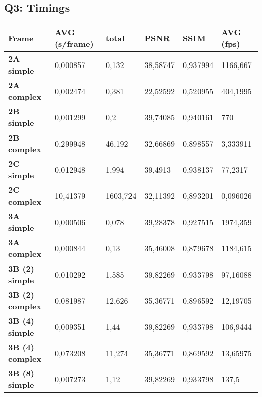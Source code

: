 \begin{appendices}
\section{Q3: Timings}\label{Q3:timings}
\begin{table}[h]
\begin{tabular}{|l|l|l|l|l|l|}
\hline
\textbf{Frame}           & \textbf{AVG (s/frame)} & \textbf{total} & \textbf{PSNR} & \textbf{SSIM} & \textbf{AVG (fps)} \\ \hline
\textbf{2A simple}       & 0,000857               & 0,132          & 38,58747      & 0,937994      & 1166,667           \\ \hline
\textbf{2A complex}      & 0,002474               & 0,381          & 22,52592      & 0,520955      & 404,1995           \\ \hline
\textbf{2B simple}       & 0,001299               & 0,2            & 39,74085      & 0,940161      & 770                \\ \hline
\textbf{2B complex}      & 0,299948               & 46,192         & 32,66869      & 0,898557      & 3,333911           \\ \hline
\textbf{2C simple}       & 0,012948               & 1,994          & 39,4913       & 0,938137      & 77,2317            \\ \hline
\textbf{2C complex}      & 10,41379               & 1603,724       & 32,11392      & 0,893201      & 0,096026           \\ \hline
\textbf{3A simple}       & 0,000506               & 0,078          & 39,28378      & 0,927515      & 1974,359           \\ \hline
\textbf{3A complex}      & 0,000844               & 0,13           & 35,46008      & 0,879678      & 1184,615           \\ \hline
\textbf{3B (2) simple}   & 0,010292               & 1,585          & 39,82269      & 0,933798      & 97,16088           \\ \hline
\textbf{3B (2) complex}  & 0,081987               & 12,626         & 35,36771      & 0,896592      & 12,19705           \\ \hline
\textbf{3B (4) simple}   & 0,009351               & 1,44           & 39,82269      & 0,933798      & 106,9444           \\ \hline
\textbf{3B (4) complex}  & 0,073208               & 11,274         & 35,36771      & 0,869592      & 13,65975           \\ \hline
\textbf{3B (8) simple}   & 0,007273               & 1,12           & 39,82269      & 0,933798      & 137,5              \\ \hline

\end{tabular}
\end{table}
\end{appendices}
